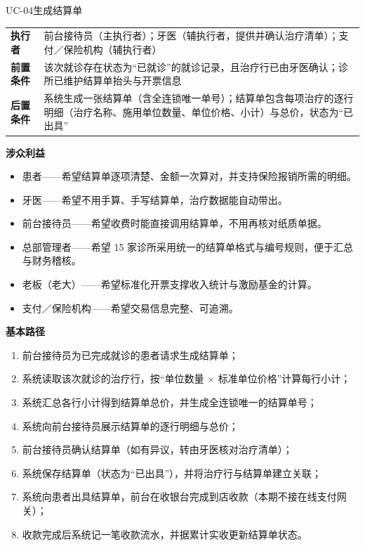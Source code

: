 \documentclass[11pt,a4paper]{ctexart}
\begin{document}
\begin{ucbox}{UC-04\quad 生成结算单}
\small
\begin{tabularx}{\linewidth}{@{}L{2.2cm}X@{}}
\toprule
\textbf{\textcolor{adcblue!92}{执行者}} & 前台接待员（主执行者）；牙医（辅执行者，提供并确认治疗清单）；支付／保险机构（辅执行者） \\
\textbf{前置条件} & 该次就诊存在状态为“已就诊”的就诊记录，且治疗行已由牙医确认；诊所已维护结算单抬头与开票信息 \\
\textbf{后置条件} & 系统生成一张结算单（含全连锁唯一单号）；结算单包含每项治疗的逐行明细（治疗名称、施用单位数量、单位价格、小计）与总价，状态为“已出具” \\
\bottomrule
\end{tabularx}

\vspace{4pt}
\textbf{涉众利益}
\begin{itemize}[leftmargin=1.4em,topsep=2pt,itemsep=1pt]
  \item 患者——希望结算单逐项清楚、金额一次算对，并支持保险报销所需的明细。
  \item 牙医——希望不用手算、手写结算单，治疗数据能自动带出。
  \item 前台接待员——希望收费时能直接调用结算单，不用再核对纸质单据。
  \item 总部管理者——希望 15 家诊所采用统一的结算单格式与编号规则，便于汇总与财务稽核。
  \item 老板（老大）——希望标准化开票支撑收入统计与激励基金的计算。
  \item 支付／保险机构——希望交易信息完整、可追溯。
\end{itemize}

\vspace{2pt}
\textbf{基本路径}
\begin{enumerate}[leftmargin=1.9em,topsep=2pt,itemsep=1pt]
  \item 前台接待员为已完成就诊的患者请求生成结算单；
  \item 系统读取该次就诊的治疗行，按“单位数量 $\times$ 标准单位价格”计算每行小计；
  \item 系统汇总各行小计得到结算单总价，并生成全连锁唯一的结算单号；
  \item 系统向前台接待员展示结算单的逐行明细与总价；
  \item 前台接待员确认结算单（如有异议，转由牙医核对治疗清单）；
  \item 系统保存结算单（状态为“已出具”），并将治疗行与结算单建立关联；
  \item 系统向患者出具结算单，前台在收银台完成到店收款（本期不接在线支付网关）；
  \item 收款完成后系统记一笔收款流水，并据累计实收更新结算单状态。
\end{enumerate}


\end{ucbox}
\end{document}
